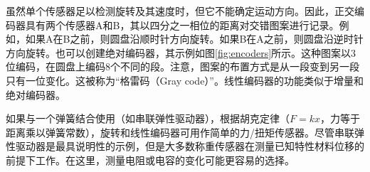 
虽然单个传感器足以检测旋转及其速度时，但它不能确定运动方向。因此，正交编码器具有两个传感器A和B，其以四分之一相位的距离对交错图案进行记录。例如，如果A在B之前，则圆盘沿顺时针方向旋转。如果B在A之前，则圆盘沿逆时针方向旋转。也可以创建绝对编码器，其示例如图\ref{fig:encoders}所示。这种图案以3位编码，在圆盘上编码8个不同的段。注意，图案的布置方式是从一段变到另一段只有一位变化。这被称为“格雷码（Gray code）”。线性编码器的功能类似于增量和绝对编码器。


如果与一个弹簧结合使用（如串联弹性驱动器），根据胡克定律（$F=kx$，力等于距离乘以弹簧常数），旋转和线性编码器可用作简单的力/扭矩传感器。尽管串联弹性驱动器是最具说明性的示例，但是大多数称重传感器在测量已知特性材料位移的前提下工作。在这里，测量电阻或电容的变化可能更容易的选择。


